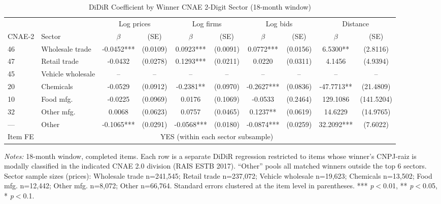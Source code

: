 \begin{table}[htbp]
\centering
\caption{DiDiR Coefficient by Winner CNAE 2-Digit Sector (18-month window)}
\label{tab:cnae_het}
\begin{adjustbox}{max width=\textwidth}
\begin{threeparttable}
\small
\begin{tabular}{llcccccccc}
\toprule
 & & \multicolumn{2}{c}{Log prices} & \multicolumn{2}{c}{Log firms}
 & \multicolumn{2}{c}{Log bids} & \multicolumn{2}{c}{Distance} \\
\cmidrule(lr){3-4} \cmidrule(lr){5-6} \cmidrule(lr){7-8} \cmidrule(lr){9-10}
CNAE-2 & Sector & $\beta$ & (SE) & $\beta$ & (SE) & $\beta$ & (SE) & $\beta$ & (SE) \\
\midrule
46 & Wholesale trade & -0.0452*** & (0.0109) & 0.0923*** & (0.0091) & 0.0772*** & (0.0156) & 6.5300** & (2.8116) \\
47 & Retail trade & -0.0432 & (0.0278) & 0.1293*** & (0.0211) & 0.0220 & (0.0311) & 4.1456 & (4.9394) \\
45 & Vehicle wholesale & -- & -- & -- & -- & -- & -- & -- & -- \\
20 & Chemicals & -0.0529 & (0.0912) & -0.2381** & (0.0970) & -0.2627*** & (0.0836) & -47.7713** & (21.4809) \\
10 & Food mfg. & -0.0225 & (0.0969) & 0.0176 & (0.1069) & -0.0533 & (0.2464) & 129.1086 & (141.5204) \\
32 & Other mfg. & 0.0068 & (0.0623) & 0.0757 & (0.0465) & 0.1237** & (0.0619) & 14.6229 & (14.9765) \\
--- & Other & -0.1065*** & (0.0291) & -0.0568*** & (0.0180) & -0.0874*** & (0.0259) & 32.2092*** & (7.6022) \\
\midrule
Item FE & \multicolumn{9}{c}{YES (within each sector subsample)} \\
\bottomrule
\end{tabular}
\begin{tablenotes}
\small
\item \textit{Notes:} 18-month window, completed items. Each row is a
separate DiDiR regression restricted to items whose winner's CNPJ-raiz is
modally classified in the indicated CNAE 2.0 division (RAIS ESTB 2017).
``Other'' pools all matched winners outside the top 6 sectors.
Sector sample sizes (prices): Wholesale trade n=241,545; Retail trade n=237,072; Vehicle wholesale n=19,623; Chemicals n=13,502; Food mfg. n=12,442; Other mfg. n=8,072; Other n=66,764.
Standard errors clustered at the item level in parentheses.
*** \textit{p}$<$0.01, ** \textit{p}$<$0.05, * \textit{p}$<$0.1.
\end{tablenotes}
\end{threeparttable}
\end{adjustbox}
\end{table}

